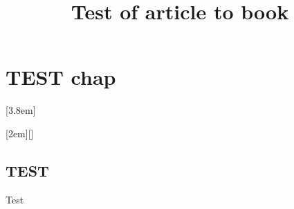 \documentclass{article}
\title{Test of article to book}
\begin{document}
    \maketitle
    \tableofcontents
    
    
    
    \chapter{TEST chap}
    [3.8em]{}{\contentslabel{2.3em}}{\hspace*{-2.3em}}{\contentspage}
    
    [2em]{}{\bfseries\contentslabel{2em}}{}{\hspace\contentspage}[]
    \section{TEST}
    Test
\end{document}

